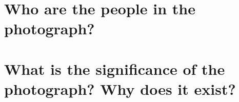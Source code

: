 \documentclass[../../main.tex]{subfiles}
\begin{document}
\section{Who are the people in the photograph?}


\section{What is the significance of the photograph? Why does it exist?}

\section{}
\end{document}
